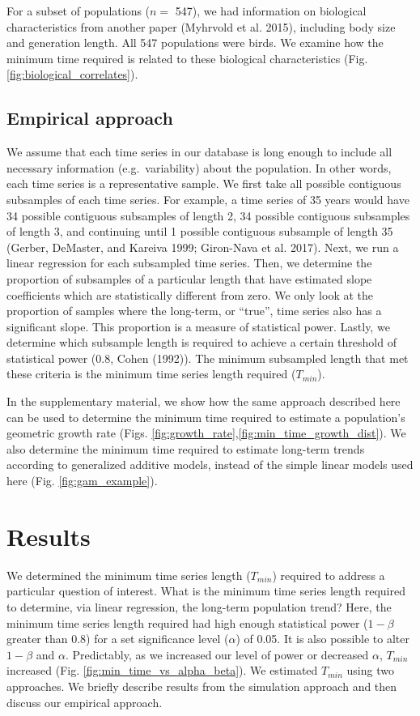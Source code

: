 \documentclass[12pt,]{article}
\begin{document}
For a subset of populations (\(n =\) 547), we had information on
biological characteristics from another paper (Myhrvold et al. 2015),
including body size and generation length. All 547 populations were
birds. We examine how the minimum time required is related to these
biological characteristics (Fig. \ref{fig:biological_correlates}).

\subsection{Empirical approach}\label{empirical-approach}

We assume that each time series in our database is long enough to
include all necessary information (e.g.~variability) about the
population. In other words, each time series is a representative sample.
We first take all possible contiguous subsamples of each time series.
For example, a time series of 35 years would have 34 possible contiguous
subsamples of length 2, 34 possible contiguous subsamples of length 3,
and continuing until 1 possible contiguous subsample of length 35
(Gerber, DeMaster, and Kareiva 1999; Giron-Nava et al. 2017). Next, we
run a linear regression for each subsampled time series. Then, we
determine the proportion of subsamples of a particular length that have
estimated slope coefficients which are statistically different from
zero. We only look at the proportion of samples where the long-term, or
``true'', time series also has a significant slope. This proportion is a
measure of statistical power. Lastly, we determine which subsample
length is required to achieve a certain threshold of statistical power
(0.8, Cohen (1992)). The minimum subsampled length that met these
criteria is the minimum time series length required (\(T_{min}\)).

In the supplementary material, we show how the same approach described
here can be used to determine the minimum time required to estimate a
population's geometric growth rate (Figs.
\ref{fig:growth_rate},\ref{fig:min_time_growth_dist}). We also determine
the minimum time required to estimate long-term trends according to
generalized additive models, instead of the simple linear models used
here (Fig. \ref{fig:gam_example}).

\section{Results}\label{results}

We determined the minimum time series length (\(T_{min}\)) required to
address a particular question of interest. What is the minimum time
series length required to determine, via linear regression, the
long-term population trend? Here, the minimum time series length
required had high enough statistical power (\(1-\beta\) greater than
0.8) for a set significance level (\(\alpha\)) of 0.05. It is also
possible to alter \(1-\beta\) and \(\alpha\). Predictably, as we
increased our level of power or decreased \(\alpha\), \(T_{min}\)
increased (Fig. \ref{fig:min_time_vs_alpha_beta}). We estimated
\(T_{min}\) using two approaches. We briefly describe results from the
simulation approach and then discuss our empirical approach.
\end{document}
